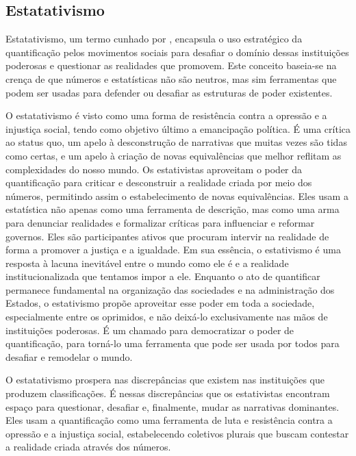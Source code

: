 \subsection{Estatativismo}

Estatativismo, um termo cunhado por , encapsula o uso estratégico da quantificação pelos movimentos sociais para desafiar o domínio dessas instituições poderosas e questionar as realidades que promovem. Este conceito baseia-se na crença de que números e estatísticas não são neutros, mas sim ferramentas que podem ser usadas para defender ou desafiar as estruturas de poder existentes. 

O estatativismo é visto como uma forma de resistência contra a opressão e a injustiça social, tendo como objetivo último a emancipação política. É uma crítica ao status quo, um apelo à desconstrução de narrativas que muitas vezes são tidas como certas, e um apelo à criação de novas equivalências que melhor reflitam as complexidades do nosso mundo. Os estativistas aproveitam o poder da quantificação para criticar e desconstruir a realidade criada por meio dos números, permitindo assim o estabelecimento de novas equivalências. Eles usam a estatística não apenas como uma ferramenta de descrição, mas como uma arma para denunciar realidades e formalizar críticas para influenciar e reformar governos. Eles são participantes ativos que procuram intervir na realidade de forma a promover a justiça e a igualdade. Em sua essência, o estativismo é uma resposta à lacuna inevitável entre o mundo como ele é e a realidade institucionalizada que tentamos impor a ele. Enquanto o ato de quantificar permanece fundamental na organização das sociedades e na administração dos Estados, o estativismo propõe aproveitar esse poder em toda a sociedade, especialmente entre os oprimidos, e não deixá-lo exclusivamente nas mãos de instituições poderosas. É um chamado para democratizar o poder de quantificação, para torná-lo uma ferramenta que pode ser usada por todos para desafiar e remodelar o mundo.

O estatativismo prospera nas discrepâncias que existem nas instituições que produzem classificações. É nessas discrepâncias que os estativistas encontram espaço para questionar, desafiar e, finalmente, mudar as narrativas dominantes. Eles usam a quantificação como uma ferramenta de luta e resistência contra a opressão e a injustiça social, estabelecendo coletivos plurais que buscam contestar a realidade criada através dos números.

